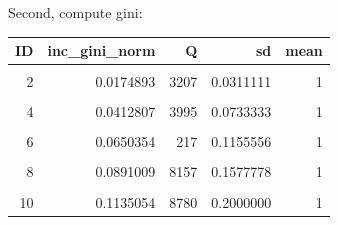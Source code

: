 \documentclass[
]{book}
\newenvironment{Shaded}{\begin{snugshade}}{\end{snugshade}}
\newcommand{\AttributeTok}[1]{\textcolor[rgb]{0.77,0.63,0.00}{#1}}
\newcommand{\CommentTok}[1]{\textcolor[rgb]{0.56,0.35,0.01}{\textit{#1}}}
\newcommand{\FunctionTok}[1]{\textcolor[rgb]{0.00,0.00,0.00}{#1}}
\newcommand{\NormalTok}[1]{#1}
\newcommand{\OtherTok}[1]{\textcolor[rgb]{0.56,0.35,0.01}{#1}}
\newcommand{\SpecialCharTok}[1]{\textcolor[rgb]{0.00,0.00,0.00}{#1}}
\newcommand{\StringTok}[1]{\textcolor[rgb]{0.31,0.60,0.02}{#1}}
\begin{document}
Second, compute gini:

\begin{Shaded}
\end{Shaded}

\begin{table}[!h]
\centering
\begin{tabular}{r|r|r|r|r}
\hline
ID & inc\_gini\_norm & Q & sd & mean\\
\hline
\cellcolor{gray!6}{1} & \cellcolor{gray!6}{0.0056006} & \cellcolor{gray!6}{3004} & \cellcolor{gray!6}{0.0100000} & \cellcolor{gray!6}{1}\\
\hline
2 & 0.0174893 & 3207 & 0.0311111 & 1\\
\hline
\cellcolor{gray!6}{3} & \cellcolor{gray!6}{0.0295527} & \cellcolor{gray!6}{7989} & \cellcolor{gray!6}{0.0522222} & \cellcolor{gray!6}{1}\\
\hline
4 & 0.0412807 & 3995 & 0.0733333 & 1\\
\hline
\cellcolor{gray!6}{5} & \cellcolor{gray!6}{0.0537107} & \cellcolor{gray!6}{8358} & \cellcolor{gray!6}{0.0944444} & \cellcolor{gray!6}{1}\\
\hline
6 & 0.0650354 & 217 & 0.1155556 & 1\\
\hline
\cellcolor{gray!6}{7} & \cellcolor{gray!6}{0.0766718} & \cellcolor{gray!6}{9506} & \cellcolor{gray!6}{0.1366667} & \cellcolor{gray!6}{1}\\
\hline
8 & 0.0891009 & 8157 & 0.1577778 & 1\\
\hline
\cellcolor{gray!6}{9} & \cellcolor{gray!6}{0.1014251} & \cellcolor{gray!6}{6216} & \cellcolor{gray!6}{0.1788889} & \cellcolor{gray!6}{1}\\
\hline
10 & 0.1135054 & 8780 & 0.2000000 & 1\\
\hline
\end{tabular}
\end{table}
\end{document}
